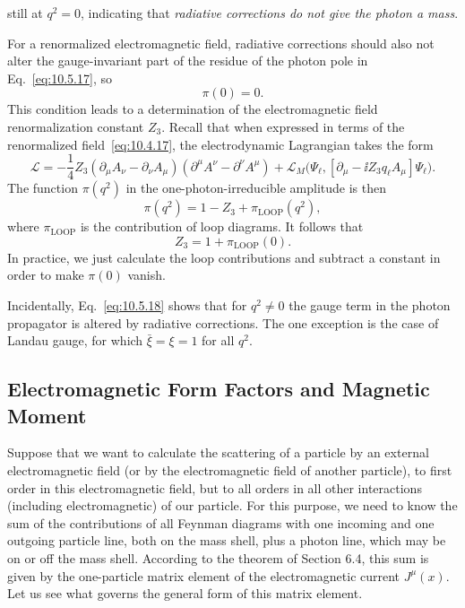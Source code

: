 
still at $q^2=0$, indicating that \emph{radiative corrections do not give the
photon a mass}.

For a renormalized electromagnetic field, radiative corrections should also
not alter the gauge-invariant part of the residue of the photon pole in
Eq.~\eqref{eq:10.5.17}, so
\begin{equation}
  \pi(0)=0.
  \tag{10.5.19}\label{eq:10.5.19}
\end{equation}
This condition leads to a determination of the electromagnetic field
renormalization constant $Z_3$. Recall that when expressed in terms of the
renormalized field~\eqref{eq:10.4.17}, the electrodynamic Lagrangian takes the
form
\begin{equation*}
  \mathcal L=-\frac14 Z_3(\partial_\mu A_\nu-\partial_\nu A_\mu)
  (\partial^\mu A^\nu-\partial^\nu A^\mu)
  +\mathcal L_M\bigl(\Psi_\ell,
  [\partial_\mu-\ii Z_3q_\ell A_\mu]\Psi_\ell\bigr).
\end{equation*}
The function $\pi(q^2)$ in the one-photon-irreducible amplitude is then
\begin{equation}
  \pi(q^2)=1-Z_3+\pi_{\mathrm{LOOP}}(q^2),
  \tag{10.5.20}\label{eq:10.5.20}
\end{equation}
where $\pi_{\mathrm{LOOP}}$ is the contribution of loop diagrams. It follows
that
\begin{equation}
  Z_3=1+\pi_{\mathrm{LOOP}}(0).
  \tag{10.5.21}\label{eq:10.5.21}
\end{equation}
In practice, we just calculate the loop contributions and subtract a constant
in order to make $\pi(0)$ vanish.

Incidentally, Eq.~\eqref{eq:10.5.18} shows that for $q^2\neq0$ the gauge term
in the photon propagator is altered by radiative corrections. The one
exception is the case of Landau gauge, for which $\bar\xi=\xi=1$ for all
$q^2$.

\subsection{Electromagnetic Form Factors and Magnetic Moment}

Suppose that we want to calculate the scattering of a particle by an external
electromagnetic field (or by the electromagnetic field of another particle),
to first order in this electromagnetic field, but to all orders in all other
interactions (including electromagnetic) of our particle. For this purpose,
we need to know the sum of the contributions of all Feynman diagrams with one
incoming and one outgoing particle line, both on the mass shell, plus a photon
line, which may be on or off the mass shell. According to the theorem of
Section 6.4, this sum is given by the one-particle matrix element of the
electromagnetic current $J^\mu(x)$. Let us see what governs the general form
of this matrix element.

